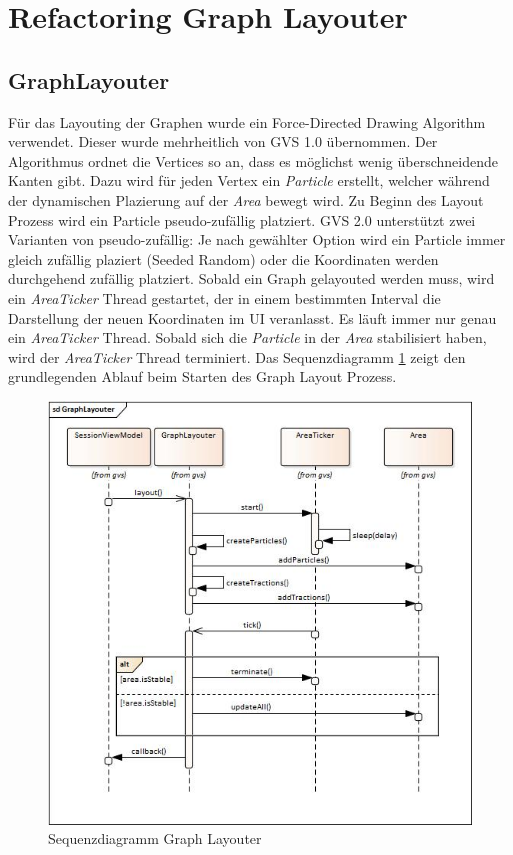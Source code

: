 \documentclass[11pt,a4paper,english,oneside]{book}
\numberwithin{equation}{chapter}
\begin{document}
	\section{Refactoring Graph Layouter}
	
	\subsection{GraphLayouter} \label{ssec:graphlayouter}
		Für das Layouting der Graphen wurde ein Force-Directed Drawing Algorithm verwendet. Dieser wurde mehrheitlich von GVS 1.0 übernommen. Der Algorithmus ordnet die Vertices so an, dass es möglichst wenig überschneidende Kanten gibt. Dazu wird für jeden Vertex ein \textit{Particle} erstellt, welcher während der dynamischen Plazierung auf der \textit{Area} bewegt wird. Zu Beginn des Layout Prozess wird ein Particle pseudo-zufällig platziert. GVS 2.0 unterstützt zwei Varianten von pseudo-zufällig: Je nach gewählter Option wird ein Particle immer gleich zufällig plaziert (Seeded Random) oder die Koordinaten werden durchgehend zufällig platziert. Sobald ein Graph gelayouted werden muss, wird ein \textit{AreaTicker} Thread gestartet, der in einem bestimmten Interval die Darstellung der neuen Koordinaten im UI veranlasst. Es läuft immer nur genau ein \textit{AreaTicker} Thread. Sobald sich die \textit{Particle} in der \textit{Area} stabilisiert haben, wird der \textit{AreaTicker} Thread terminiert. Das Sequenzdiagramm \ref{fig:sequencegraphlayouter} zeigt den grundlegenden Ablauf beim Starten des Graph Layout Prozess.
	
	\begin{figure}[h!]
		\centering
		\includegraphics[width=0.6\linewidth]{assets/images/sequence_graph_layouter}
		\caption{Sequenzdiagramm Graph Layouter}
		\label{fig:sequencegraphlayouter}
	\end{figure}
	
\end{document}
